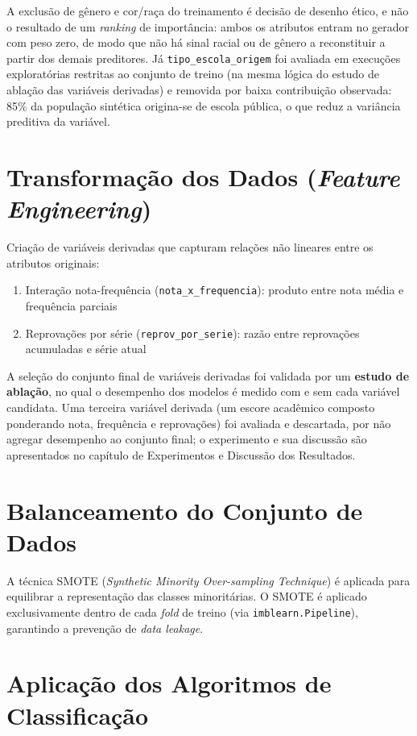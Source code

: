 A exclusão de gênero e cor/raça do treinamento é decisão de desenho ético, e não o resultado de um \textit{ranking} de importância: ambos os atributos entram no gerador com peso zero, de modo que não há sinal racial ou de gênero a reconstituir a partir dos demais preditores. Já \texttt{tipo\_escola\_origem} foi avaliada em execuções exploratórias restritas ao conjunto de treino (na mesma lógica do estudo de ablação das variáveis derivadas) e removida por baixa contribuição observada: 85\% da população sintética origina-se de escola pública, o que reduz a variância preditiva da variável.

\section{Transformação dos Dados (\textit{Feature Engineering})}

Criação de variáveis derivadas que capturam relações não lineares entre os atributos originais:

\begin{enumerate}
    \item Interação nota-frequência (\texttt{nota\_x\_frequencia}): produto entre nota média e frequência parciais
    \item Reprovações por série (\texttt{reprov\_por\_serie}): razão entre reprovações acumuladas e série atual
\end{enumerate}

A seleção do conjunto final de variáveis derivadas foi validada por um \textbf{estudo de ablação}, no qual o desempenho dos modelos é medido com e sem cada variável candidata. Uma terceira variável derivada (um escore acadêmico composto ponderando nota, frequência e reprovações) foi avaliada e descartada, por não agregar desempenho ao conjunto final; o experimento e sua discussão são apresentados no capítulo de Experimentos e Discussão dos Resultados.

\section{Balanceamento do Conjunto de Dados}

A técnica SMOTE (\textit{Synthetic Minority Over-sampling Technique}) é aplicada para equilibrar a representação das classes minoritárias. O SMOTE é aplicado exclusivamente dentro de cada \textit{fold} de treino (via \texttt{imblearn.Pipeline}), garantindo a prevenção de \textit{data leakage}.

\section{Aplicação dos Algoritmos de Classificação}

